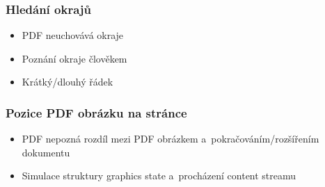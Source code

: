 \begin{frame}\frametitle{Hledání okrajů}

  \begin{itemize}
    \item PDF neuchovává okraje
    \item Poznání okraje člověkem
    \item Krátký/dlouhý řádek 
  \end{itemize}

\end{frame}

\begin{frame}\frametitle{Pozice PDF obrázku na stránce}

  \begin{itemize}
    \item PDF nepozná rozdíl mezi PDF obrázkem a~pokračováním/rozšířením dokumentu 
    \item Simulace struktury graphics state a~procházení content streamu
  \end{itemize}

\end{frame}



